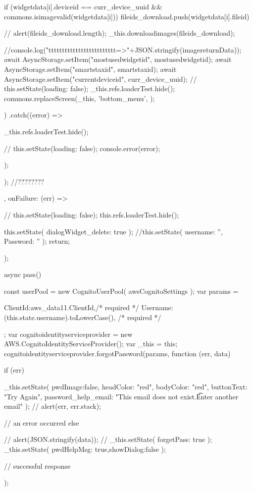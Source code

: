 {{{{{{{{{{{                if (widgetdata[i].deviceid == curr_device_uuid && commons.isimagevalid(widgetdata[i])) {
                  fileids_download.push(widgetdata[i].fileid)
                }

              }
              // alert(fileids_download.length);
              _this.downloadimages(fileids_download);
            }
            //console.log("ttttttttttttttttttttttttt=>"+JSON.stringify(imagereturnData));
            await AsyncStorage.setItem("mostusedwidgetid", mostusedwidgetid);          
            await  AsyncStorage.setItem("smartstaxid", smartstaxid);  
            await AsyncStorage.setItem("currentdeviceid", curr_device_uuid);
            //  this.setState({loading: false});
            _this.refs.loaderTest.hide();
            commons.replaceScreen(_this, 'bottom_menu', {});
          })
          .catch((error) => {
            _this.refs.loaderTest.hide();

            //  this.setState({loading: false});
            console.error(error);
          });
        } 
      });  
//????????
      },
      onFailure: (err) => {
        // this.setState({loading: false});
        this.refs.loaderTest.hide();

        this.setState({ dialogWidget_delete: true });                //this.setState({ username: '', Password: '' });
        return;
      }
    });



  }
  async pass() {
   
    const userPool = new CognitoUserPool(
      awsCognitoSettings
    );
    var params = {
      ClientId:aws_data11.ClientId,/* required */
      Username: (this.state.username).toLowerCase(), /* required */

    };
    var cognitoidentityserviceprovider = new AWS.CognitoIdentityServiceProvider();
    var _this = this;
    cognitoidentityserviceprovider.forgotPassword(params, function (err, data) {
      if (err) {
        _this.setState({
          pwdImage:false,
          headColor: "red",
          bodyColor: "red",
          buttonText: "Try Again",
          password_help_email: "This email does not exist.\n\t Enter another email"
        });
        //  alert(err, err.stack);

      } // an error occurred
      else {   //  alert(JSON.stringify(data));  
       // _this.setState({ forgetPass: true });
       _this.setState({ pwdHelpMsg: true,showDialog:false });

      }          // successful response
    });

}}}}
